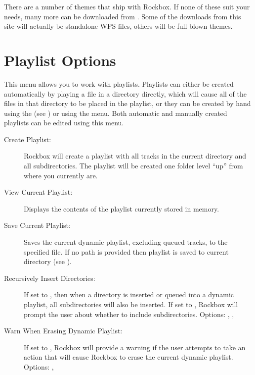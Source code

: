 There are a number of themes that ship with Rockbox. If none of
these suit your needs, many more can be downloaded from 
%
%
%
%
%
%
%
.
Some of the downloads from this site will actually be standalone WPS files, 
others will be full-blown themes. 




\section{\label{ref:playlistoptions}Playlist Options}
  This menu allows you to work with playlists. Playlists can either be created
automatically by playing a file in a directory directly, which will cause all 
of the files in that directory to be placed in the playlist, or they can be
created by hand using the  (see ) 
or using the  menu.  Both  automatic and manually 
created playlists can be edited using this menu.

\begin{description}
\item[Create Playlist:]
  Rockbox will create a playlist with all tracks in the current directory 
and all subdirectories. The playlist will be created one folder level ``up'' 
from where you currently are.
  
\item[View Current Playlist:]
  Displays the contents of the playlist currently stored in memory.
  
\item[Save Current Playlist:]
  Saves the current dynamic playlist, excluding queued tracks, to the 
specified file. If no path is provided then playlist is saved to current 
directory (see ).
  
\item[Recursively Insert Directories: ]
  If set to , then when a directory is inserted or queued into a 
  dynamic playlist, all subdirectories will also be inserted. If set to ,
  Rockbox will prompt the user about whether to include subdirectories.
  Options: , , 

\item[Warn When Erasing Dynamic Playlist: ]
  If set to , Rockbox will provide a warning if the user attempts to
  take an action that will cause Rockbox to erase the current dynamic playlist.
  Options: , 
\end{description}

